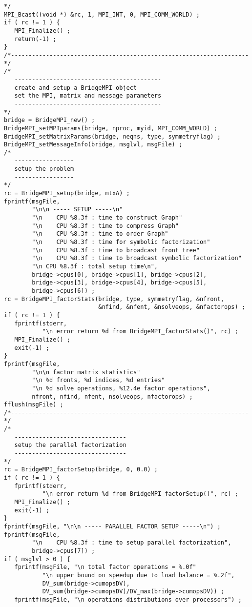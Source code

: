 \begin{verbatim}
*/
MPI_Bcast((void *) &rc, 1, MPI_INT, 0, MPI_COMM_WORLD) ;
if ( rc != 1 ) {
   MPI_Finalize() ;
   return(-1) ;
}
/*--------------------------------------------------------------------*/
/*
   ------------------------------------------
   create and setup a BridgeMPI object
   set the MPI, matrix and message parameters
   ------------------------------------------
*/
bridge = BridgeMPI_new() ;
BridgeMPI_setMPIparams(bridge, nproc, myid, MPI_COMM_WORLD) ;
BridgeMPI_setMatrixParams(bridge, neqns, type, symmetryflag) ;
BridgeMPI_setMessageInfo(bridge, msglvl, msgFile) ;
/*
   -----------------
   setup the problem
   -----------------
*/
rc = BridgeMPI_setup(bridge, mtxA) ;
fprintf(msgFile, 
        "\n\n ----- SETUP -----\n"
        "\n    CPU %8.3f : time to construct Graph"
        "\n    CPU %8.3f : time to compress Graph"
        "\n    CPU %8.3f : time to order Graph"
        "\n    CPU %8.3f : time for symbolic factorization"
        "\n    CPU %8.3f : time to broadcast front tree"
        "\n    CPU %8.3f : time to broadcast symbolic factorization"
        "\n CPU %8.3f : total setup time\n",
        bridge->cpus[0], bridge->cpus[1], bridge->cpus[2],
        bridge->cpus[3], bridge->cpus[4], bridge->cpus[5],
        bridge->cpus[6]) ;
rc = BridgeMPI_factorStats(bridge, type, symmetryflag, &nfront,
                           &nfind, &nfent, &nsolveops, &nfactorops) ;
if ( rc != 1 ) { 
   fprintf(stderr, 
           "\n error return %d from BridgeMPI_factorStats()", rc) ;
   MPI_Finalize() ;
   exit(-1) ;
}
fprintf(msgFile, 
        "\n\n factor matrix statistics"
        "\n %d fronts, %d indices, %d entries"
        "\n %d solve operations, %12.4e factor operations",
        nfront, nfind, nfent, nsolveops, nfactorops) ;
fflush(msgFile) ;
/*--------------------------------------------------------------------*/
/*
   --------------------------------
   setup the parallel factorization
   --------------------------------
*/
rc = BridgeMPI_factorSetup(bridge, 0, 0.0) ;
if ( rc != 1 ) { 
   fprintf(stderr, 
           "\n error return %d from BridgeMPI_factorSetup()", rc) ;
   MPI_Finalize() ;
   exit(-1) ;
}
fprintf(msgFile, "\n\n ----- PARALLEL FACTOR SETUP -----\n") ;
fprintf(msgFile, 
        "\n    CPU %8.3f : time to setup parallel factorization",
        bridge->cpus[7]) ;
if ( msglvl > 0 ) {
   fprintf(msgFile, "\n total factor operations = %.0f"
           "\n upper bound on speedup due to load balance = %.2f",
           DV_sum(bridge->cumopsDV),
           DV_sum(bridge->cumopsDV)/DV_max(bridge->cumopsDV)) ;
   fprintf(msgFile, "\n operations distributions over processors") ;

\end{verbatim}
